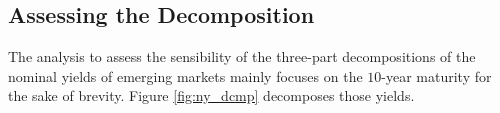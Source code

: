 {%



\subsection{Assessing the Decomposition}
\iftoggle{toclinks}{\gototoc}{} %


The analysis to assess the sensibility of the three-part decompositions of the nominal yields of emerging markets mainly focuses on the \(10\)-year maturity for the sake of brevity.
%	
Figure \ref{fig:ny_dcmp} decomposes those yields.

}
